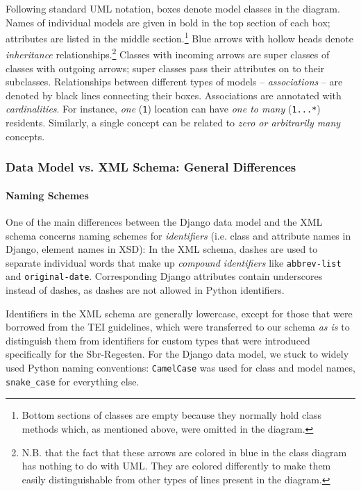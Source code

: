Following standard UML notation, boxes denote model classes in the
diagram. Names of individual models are given in bold in the top
section of each box; attributes are listed in the middle
section.\footnote{Bottom sections of classes are empty because they
  normally hold class methods which, as mentioned above, were omitted
  in the diagram.} Blue arrows with hollow heads denote
\emph{inheritance} relationships.\footnote{N.B. that the fact that
  these arrows are colored in blue in the class diagram has nothing to
  do with UML. They are colored differently to make them easily
  distinguishable from other types of lines present in the diagram.}
Classes with incoming arrows are super classes of classes with
outgoing arrows; super classes pass their attributes on to their
subclasses. Relationships between different types of models --
\emph{associations} -- are denoted by black lines connecting their
boxes. Associations are annotated with \emph{cardinalities}. For
instance, \emph{one} (\texttt{1}) location can have \emph{one to many}
(\texttt{1...*}) residents. Similarly, a single concept can be related
to \emph{zero or arbitrarily many} concepts.

\subsubsection{Data Model vs. XML Schema: General Differences}
\label{sec:gen-diff}

\paragraph{Naming Schemes}

One of the main differences between the Django data model and the XML
schema concerns naming schemes for \emph{identifiers} (i.e. class and
attribute names in Django, element names in XSD): In the XML schema,
dashes are used to separate individual words that make up
\emph{compound identifiers} like \texttt{abbrev-list} and
\texttt{original-date}. Corresponding Django attributes contain
underscores instead of dashes, as dashes are not allowed in Python
identifiers.

Identifiers in the XML schema are generally lowercase, except for
those that were borrowed from the TEI guidelines, which were
transferred to our schema \emph{as is} to distinguish them from
identifiers for custom types that were introduced specifically for the
Sbr-Regesten. For the Django data model, we stuck to widely used
Python naming conventions: \texttt{CamelCase} was used for class and
model names, \texttt{snake\_case} for everything else.

